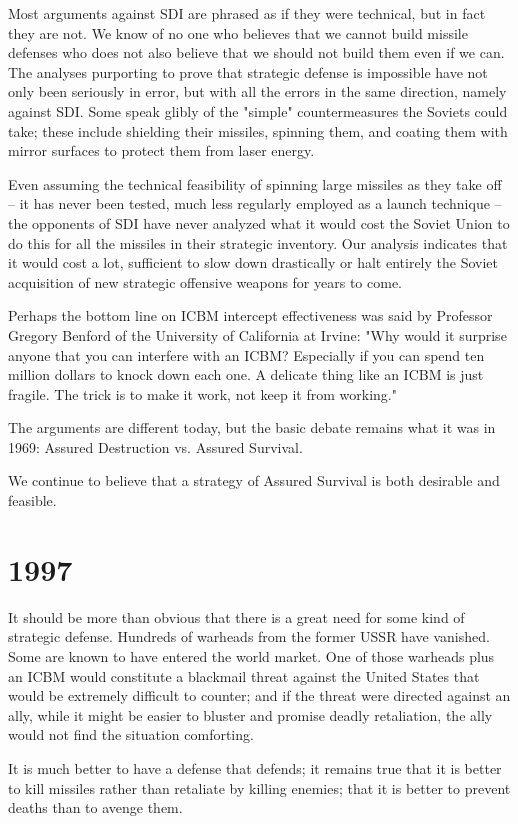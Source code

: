 Most arguments against SDI are phrased as if they were technical, but in fact they are not. We know of no one who believes that we cannot build missile defenses who does not also believe that we should not build them even if we can. The analyses purporting to prove that strategic defense is impossible have not only been seriously in error, but with all the errors in the same direction, namely against SDI. Some speak glibly of the "simple" countermeasures the Soviets could take; these include shielding their missiles, spinning them, and coating them with mirror surfaces to protect them from laser energy.

Even assuming the technical feasibility of spinning large missiles as they take off -- it has never been tested, much less regularly employed as a launch technique -- the opponents of SDI have never analyzed what it would cost the Soviet Union to do this for all the missiles in their strategic inventory. Our analysis indicates that it would cost a lot, sufficient to slow down drastically or halt entirely the Soviet acquisition of new strategic offensive weapons for years to come.

Perhaps the bottom line on ICBM intercept effectiveness was said by Professor Gregory Benford of the University of California at Irvine: "Why would it surprise anyone that you can interfere with an ICBM? Especially if you can spend ten million dollars to knock down each one. A delicate thing like an ICBM is just fragile. The trick is to make it work, not keep it from working."

The arguments are different today, but the basic debate remains what it was in 1969: Assured Destruction vs. Assured Survival.

We continue to believe that a strategy of Assured Survival is both desirable and feasible.

\section{1997}

It should be more than obvious that there is a great need for some kind of strategic defense. Hundreds of warheads from the former USSR have vanished. Some are known to have entered the world market. One of those warheads plus an ICBM would constitute a blackmail threat against the United States that would be extremely difficult to counter; and if the threat were directed against an ally, while it might be easier to bluster and promise deadly retaliation, the ally would not find the situation comforting.

It is much better to have a defense that defends; it remains true that it is better to kill missiles rather than retaliate by killing enemies; that it is better to prevent deaths than to avenge them.


